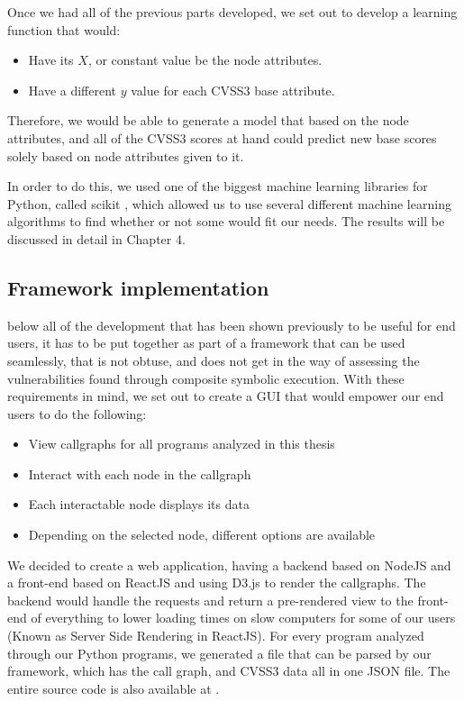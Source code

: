 Once we had all of the previous parts developed, we set out to develop a learning function that would:

\begin{itemize}
	\item Have its $X$, or constant value be the node attributes.
	\item Have a different $y$ value for each CVSS3 base attribute.
\end{itemize}

Therefore, we would be able to generate a model that based on the node attributes, and all of the CVSS3 scores at hand could predict new base scores solely based on node attributes given to it.

In order to do this, we used one of the biggest machine learning libraries for Python, called scikit \parencite{scikit}, which allowed us to use several different machine learning algorithms to find whether or not some would fit our needs. The results will be discussed in detail in Chapter 4.
\subsection{Framework implementation}

below all of the development that has been shown previously to be useful for end users, it has to be put together as part of a framework that can be used seamlessly, that is not obtuse, and does not get in the way of assessing the vulnerabilities found through composite symbolic execution. With these requirements in mind, we set out to create a GUI that would empower our end users to do the following:

\begin{itemize}
	\item View callgraphs for all programs analyzed in this thesis
	\item Interact with each node in the callgraph
	\item Each interactable node displays its data
	\item Depending on the selected node, different options are available
\end{itemize}

We decided to create a web application, having a backend based on NodeJS and a front-end based on ReactJS and using D3.js to render the callgraphs. The backend would handle the requests and return a pre-rendered view to the front-end of everything to lower loading times on slow computers for some of our users (Known as Server Side Rendering in ReactJS). For every program analyzed through our Python programs, we generated a file that can be parsed by our framework, which has the call graph, and CVSS3 data all in one JSON file. The entire source code is also available at \parencite{ricardo}.




